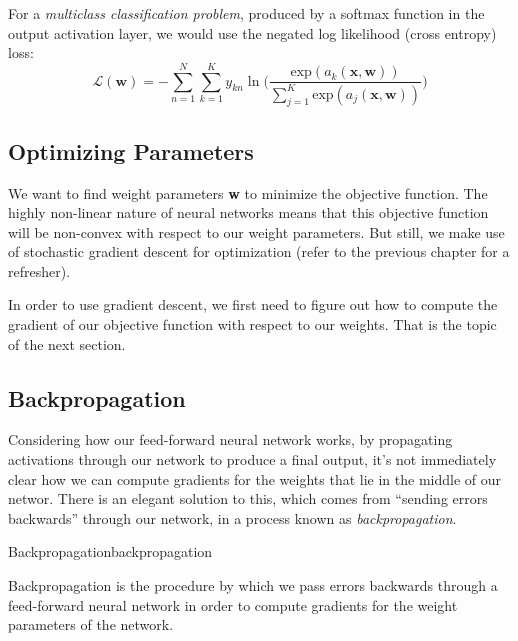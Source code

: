       For a {\em multiclass classification problem}, produced by a softmax function in the output activation layer, we
      would use the negated log likelihood (cross entropy) loss:
\begin{equation} \label{multiclass-cross-entropy-loss-function}
	\mathcal{L}(\textbf{w}) = - \sum_{n=1}^{N} \sum_{k=1}^{K} y_{kn} \ln{\bigg(\frac{\text{exp}(a_{k}(\textbf{x}, \textbf{w}))}{\sum_{j=1}^{K}\text{exp}(a_{j}(\textbf{x}, \textbf{w}))}\bigg)}
\end{equation}


\subsection{Optimizing Parameters}

We want to find weight parameters \textbf{w} to minimize the objective function. The highly non-linear nature of neural networks means that this objective function will be non-convex with respect to our weight parameters. But still, we make use of stochastic gradient descent for optimization (refer to the previous chapter for a refresher).

In order to use gradient descent, we first need to figure out how to compute the gradient of our objective function with respect to our weights. That is the topic of the next section.

\subsection{Backpropagation}

Considering how our feed-forward neural network works, by propagating activations through our network to produce a final output, it's not immediately clear how we can compute gradients for the weights that lie in the middle of our networ. There is an elegant solution to this, which comes from ``sending errors backwards'' through our network, in a process known as \textit{backpropagation}.

\begin{definition}{Backpropagation}{backpropagation}
  
Backpropagation is the procedure by which we pass errors backwards through a feed-forward neural network in order to compute gradients for the weight parameters of the network.
\end{definition}

